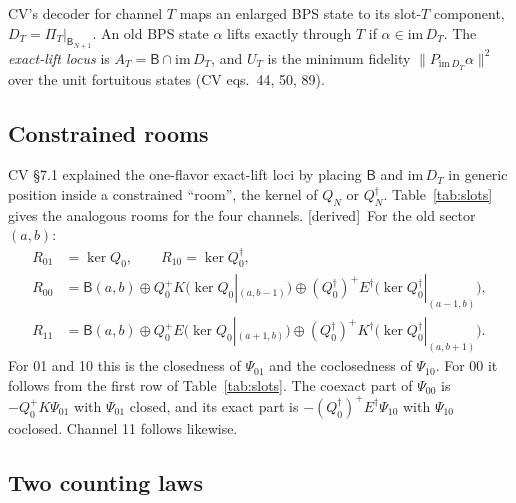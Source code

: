 \documentclass[11pt]{article}
\newcommand{\B}{\mathsf B}
\newcommand{\tagbox}[2]{\textsf{\small\color{#1}[#2]}}
\newcommand{\DER}{\tagbox{cder}{derived}}
\theoremstyle{plain}
\theoremstyle{remark}
\numberwithin{equation}{section}
\begin{document}
CV's decoder for channel $T$ maps an enlarged BPS state to its slot-$T$ component, $D_T=\Pi_T|_{\B_{N+1}}$. An old BPS
state $\alpha$ lifts exactly through $T$ if $\alpha\in\mathrm{im}\,D_T$. The \emph{exact-lift locus} is
$A_T=\B\cap\mathrm{im}\,D_T$, and $U_T$ is the minimum fidelity $\|P_{\mathrm{im}\,D_T}\alpha\|^2$ over the unit
fortuitous states (CV eqs.~44, 50, 89).

\subsection{Constrained rooms}\label{sec:rooms}

CV \S7.1 explained the one-flavor exact-lift loci by placing $\B$ and $\mathrm{im}\,D_T$ in generic position inside a
constrained ``room'', the kernel of $Q_N$ or $Q_N^\dagger$. Table~\ref{tab:slots} gives the analogous rooms for the four
channels. \DER\ For the old sector $(a,b)$:
\begin{align}
R_{01}&=\ker Q_0,\qquad R_{10}=\ker Q_0^\dagger,\nonumber\\
R_{00}&=\B(a,b)\oplus Q_0^+K\big(\ker Q_0|_{(a,b-1)}\big)\oplus(Q_0^\dagger)^+E^\dagger\big(\ker Q_0^\dagger|_{(a-1,b)}\big),\label{eq:rooms}\\
R_{11}&=\B(a,b)\oplus Q_0^+E\big(\ker Q_0|_{(a+1,b)}\big)\oplus(Q_0^\dagger)^+K^\dagger\big(\ker Q_0^\dagger|_{(a,b+1)}\big).\nonumber
\end{align}
For 01 and 10 this is the closedness of $\Psi_{01}$ and the coclosedness of $\Psi_{10}$. For 00 it follows from the first
row of Table~\ref{tab:slots}. The coexact part of $\Psi_{00}$ is $-Q_0^+K\Psi_{01}$ with $\Psi_{01}$ closed, and its
exact part is $-(Q_0^\dagger)^+E^\dagger\Psi_{10}$ with $\Psi_{10}$ coclosed. Channel 11 follows likewise.

\subsection{Two counting laws}
\end{document}
